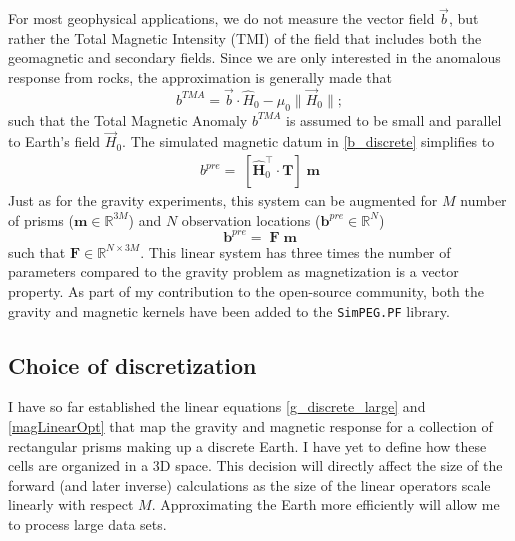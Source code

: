 For most geophysical applications, we do not measure the vector field $\vec b$, but rather the Total Magnetic Intensity (TMI) of the field that includes both the geomagnetic and secondary fields. Since we are only interested in the anomalous response from rocks, the approximation is generally made that
\begin{equation}\label{TMIprojection}
{b}^{TMA} = \vec{b} \cdot {{\hat H_0}} - \mu_0\|\vec{H}_0\|;
\end{equation}
such that the Total Magnetic Anomaly $b^{TMA}$ is assumed to be small and parallel to Earth's field $\vec{H}_0$.
The simulated magnetic datum in \eqref{b_discrete} simplifies to
\begin{equation}
\begin{split}
{b}^{pre} =\; \left[ \mathbf{ {\hat H}}_0^\top \cdot \mathbf{T}\right]\;\mathbf{m}
\end{split}
\end{equation}
Just as for the gravity experiments, this system can be augmented for $M$ number of prisms ($\mathbf{m} \in \mathbb{R}^{3M}$) and $N$ observation locations ($\mathbf{b}^{pre} \in \mathbb{R}^{N}$)
\begin{equation}\label{magLinearOpt}
\mathbf{b}^{pre} =\; \mathbf{F} \;\mathbf{m}
\end{equation}
such that $\mathbf{F}\in \mathbb{R}^{N\times 3M}$. This linear system has three times the number of parameters compared to the gravity problem as magnetization is a vector property.
As part of my contribution to the open-source community, both the gravity and magnetic kernels have been added to the \texttt{SimPEG.PF} library.

\subsection{Choice of discretization}
I have so far established the linear equations \eqref{g_discrete_large} and \eqref{magLinearOpt} that map the gravity and magnetic response for a collection of rectangular prisms making up a discrete Earth. I have yet to define how these cells are organized in a 3D space. This decision will directly affect the size of the forward (and later inverse) calculations as the size of the linear operators scale linearly with respect $M$. Approximating the Earth more efficiently will allow me to process large data sets.


